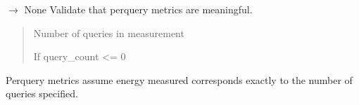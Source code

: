 \documentclass[letterpaper,10pt,english]{sphinxmanual}
\begin{document}
\begin{fulllineitems}
\begin{fulllineitems}
\end{fulllineitems}


\begin{fulllineitems}
\label{\detokenize{core.sustainability.models.carbon_metrics:id16}}
\pysigstartsignatures
\pysigline
{}
\pysigstopsignatures
\end{fulllineitems}


\begin{fulllineitems}
\label{\detokenize{core.sustainability.models.carbon_metrics:core.sustainability.models.carbon_metrics.CarbonMetrics.validate_query_count}}
\pysigstartsignatures
\pysiglinewithargsret
{}
{}
{{ $\rightarrow$ None}}
\pysigstopsignatures
\sphinxAtStartPar
Validate that per\sphinxhyphen{}query metrics are meaningful.
\begin{quote}\begin{description}
\sphinxAtStartPar
{} \textendash{} Number of queries in measurement

\sphinxAtStartPar
{} \textendash{} If query\_count \textless{}= 0

\end{description}\end{quote}
\begin{description}
\sphinxAtStartPar
Per\sphinxhyphen{}query metrics assume energy measured corresponds exactly
to the number of queries specified.

\end{description}

\end{fulllineitems}


\end{fulllineitems}
\end{document}
